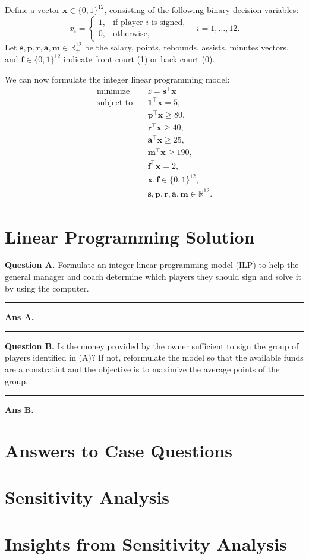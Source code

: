 \documentclass[a4paper,11pt]{article}
\newcommand{\vsp}{\vspace{0.5em}}
\newcommand{\ruler}{
    \vspace{1em}
    \hrule
    \vspace{1em}
}
\begin{document}
Define a vector $\bm{x} \in \{0, 1\}^{12}$, consisting of the following binary decision variables:
$$x_i=\begin{cases}1,&\text{if player }i\text{ is signed,}\\0,&\text{otherwise,}\end{cases}\quad i=1,\dots,12.$$ 
Let
$\bm{s},\bm{p},\bm{r},\bm{a},\bm{m}\in\mathbb{R}_{+}^{12}$ be the salary, points, rebounds, assists, minutes vectors, and
$\bm{f}\in\{0,1\}^{12}$ indicate front court (1) or back court (0).

\vspace{1em}
We can now formulate the integer linear programming model:
\[
\begin{aligned}
\text{minimize} \quad & z=\bm{s}^\top\bm{x}\\
\text{subject to}\quad
&\bm{1}^\top\bm{x}=5,\\
&\bm{p}^\top\bm{x}\ge80,\\
&\bm{r}^\top\bm{x}\ge40,\\
&\bm{a}^\top\bm{x}\ge25,\\
&\bm{m}^\top\bm{x}\ge190,\\
&\bm{f}^\top\bm{x}=2, \\
&\bm{x}, \bm{f} \in \{0,1\}^{12}, \\
&\bm{s}, \bm{p}, \bm{r}, \bm{a}, \bm{m} \in \mathbb{R}_+^{12}.
\end{aligned}
\]

\section*{Linear Programming Solution}

\textbf{Question A.} 
Formulate an integer linear programming model (ILP) to help the general manager and coach determine which players they should sign and solve it by using the computer.

\ruler

\textbf{Ans A.}

\ruler

\vsp

\textbf{Question B.} 
Is the money provided by the owner sufficient to sign the group of players identified in (A)? If not, reformulate the model so that the available funds are a constratint and the objective is to maximize the average points of the group.

\ruler

\textbf{Ans B.}

\section*{Answers to Case Questions}

\section*{Sensitivity Analysis}

\section*{Insights from Sensitivity Analysis}
\end{document}
